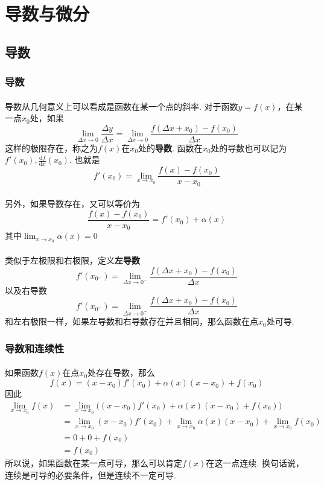 \section{导数与微分}

\subsection{导数}

\subsubsection{导数}
\paragraph{}
导数从几何意义上可以看成是函数在某一个点的斜率. 对于函数$y = f(x)$，在某一点$x_0$处，如果
$$
\lim_{\Delta x \to 0} \frac{\Delta y}{\Delta x} = \lim_{\Delta x \to 0}  \frac{f(\Delta x + x_0)  - f(x_0)}{\Delta x}
$$
这样的极限存在，称之为$f(x)$在$x_0$处的\textbf{导数}. 函数在$x_0$处的导数也可以记为$f'(x_0), \frac{\mathrm{d}f}{\mathrm{d}x}(x_0)$.  也就是
$$
f'(x_0) =  \lim_{x\to x_0}  \frac{f(x)  - f(x_0)}{x - x_0}
$$

\paragraph{}
另外，如果导数存在，又可以等价为
$$
\frac{f(x) - f(x_0)}{x - x_0} = f'(x_0) + \alpha(x)
$$
其中$\lim_{x \to x_0} \alpha(x) = 0$

\paragraph{}
类似于左极限和右极限，定义\textbf{左导数}
$$
f'(x_{0^-}) =  \lim_{\Delta x \to 0^-}  \frac{f(\Delta x + x_0)  - f(x_0)}{\Delta x}
$$
以及右导数
$$
f'(x_{0^+}) =  \lim_{\Delta x \to 0^+}  \frac{f(\Delta x + x_0)  - f(x_0)}{\Delta x}
$$
和左右极限一样，如果左导数和右导数存在并且相同，那么函数在点$x_0$处可导. 

\subsubsection{导数和连续性}
\paragraph{}
如果函数$f(x)$在点$x_0$处存在导数，那么
$$
f(x)  = (x - x_0) f'(x_0) + \alpha(x) (x - x_0) + f(x_0)
$$
因此
\begin{align*}
\lim_{x\to x_0} f(x) & = \lim_{x\to x_0} \big( (x - x_0) f'(x_0) + \alpha(x) (x - x_0) + f(x_0) \big) \\
& = \lim_{x\to x_0} (x - x_0) f'(x_0) + \lim_{x\to x_0}  \alpha(x) (x - x_0) + \lim_{x\to x_0} f(x_0) \\
& = 0 + 0 + f(x_0) \\
& = f(x_0)
\end{align*}
所以说，如果函数在某一点可导，那么可以肯定$f(x)$在这一点连续. 换句话说，连续是可导的必要条件，但是连续不一定可导.


